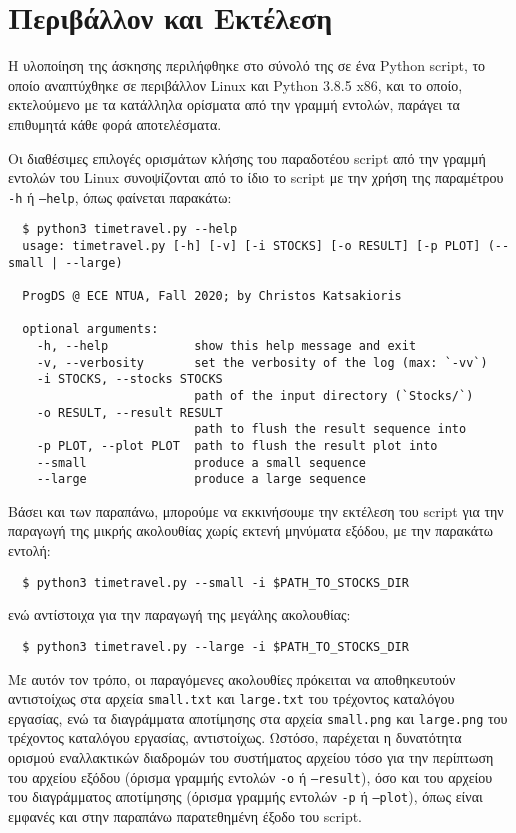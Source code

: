 \section{Περιβάλλον και Εκτέλεση}

Η υλοποίηση της άσκησης περιλήφθηκε στο σύνολό της σε ένα Python script, το οποίο αναπτύχθηκε σε περιβάλλον Linux και Python 3.8.5 x86, και το οποίο, εκτελούμενο με τα κατάλληλα ορίσματα από την γραμμή εντολών, παράγει τα επιθυμητά κάθε φορά αποτελέσματα.

Οι διαθέσιμες επιλογές ορισμάτων κλήσης του παραδοτέου script από την γραμμή εντολών του Linux συνοψίζονται από το ίδιο το script με την χρήση της παραμέτρου \texttt{-h} ή \texttt{--help}, όπως φαίνεται παρακάτω:

\begin{verbatim}
  $ python3 timetravel.py --help
  usage: timetravel.py [-h] [-v] [-i STOCKS] [-o RESULT] [-p PLOT] (--small | --large)
  
  ProgDS @ ECE NTUA, Fall 2020; by Christos Katsakioris
  
  optional arguments:
    -h, --help            show this help message and exit
    -v, --verbosity       set the verbosity of the log (max: `-vv`)
    -i STOCKS, --stocks STOCKS
                          path of the input directory (`Stocks/`)
    -o RESULT, --result RESULT
                          path to flush the result sequence into
    -p PLOT, --plot PLOT  path to flush the result plot into
    --small               produce a small sequence
    --large               produce a large sequence
\end{verbatim}

Βάσει και των παραπάνω, μπορούμε να εκκινήσουμε την εκτέλεση του script για την παραγωγή της μικρής ακολουθίας χωρίς εκτενή μηνύματα εξόδου, με την παρακάτω εντολή:

\begin{verbatim}
  $ python3 timetravel.py --small -i $PATH_TO_STOCKS_DIR
\end{verbatim}

ενώ αντίστοιχα για την παραγωγή της μεγάλης ακολουθίας:

\begin{verbatim}
  $ python3 timetravel.py --large -i $PATH_TO_STOCKS_DIR
\end{verbatim}

Με αυτόν τον τρόπο, οι παραγόμενες ακολουθίες πρόκειται να αποθηκευτούν αντιστοίχως στα αρχεία \texttt{small.txt} και \texttt{large.txt} του τρέχοντος καταλόγου εργασίας, ενώ τα διαγράμματα αποτίμησης στα αρχεία \texttt{small.png} και \texttt{large.png} του τρέχοντος καταλόγου εργασίας, αντιστοίχως.
Ωστόσο, παρέχεται η δυνατότητα ορισμού εναλλακτικών διαδρομών του συστήματος αρχείου τόσο για την περίπτωση του αρχείου εξόδου (όρισμα γραμμής εντολών \texttt{-o} ή \texttt{--result}), όσο και του αρχείου του διαγράμματος αποτίμησης (όρισμα γραμμής εντολών \texttt{-p} ή \texttt{--plot}), όπως είναι εμφανές και στην παραπάνω παρατεθημένη έξοδο του script.
